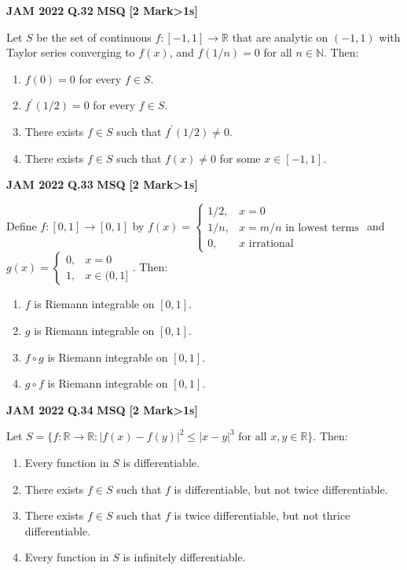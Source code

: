 \documentclass[11pt,a4paper]{article}
\newcommand{\pyqheader}[4]{%
    \noindent\begin{tcolorbox}[
        colback=badgebg,
        colframe=secondary,
        arc=2mm,
        boxrule=0.6pt,
        top=1.5mm,bottom=1.5mm,left=2mm,right=2mm
    ]
        \textbf{\textcolor{primary}{JAM #1}} \hfill \textbf{Q.#2} \hfill \textsc{\textbf{#3}} \hfill \textbf{[#4 Mark\ifnum#4>1s\fi]}
    \end{tcolorbox}\vspace{-1mm}
}
\begin{document}
\pyqheader{2022}{32}{MSQ}{2}
Let $S$ be the set of continuous $f:[-1,1]\rightarrow\mathbb{R}$ that are analytic on $(-1,1)$ with Taylor series converging to $f(x)$, and $f(1/n)=0$ for all $n\in\mathbb{N}$. Then:
\begin{enumerate}[label=(\Alph*)]
    \item $f(0)=0$ for every $f\in S$.
    \item $f^{\prime}(1/2)=0$ for every $f\in S$.
    \item There exists $f\in S$ such that $f^{\prime}(1/2)\ne 0$.
    \item There exists $f\in S$ such that $f(x)\ne 0$ for some $x\in[-1,1]$.
\end{enumerate}

\pyqheader{2022}{33}{MSQ}{2}
Define $f:[0,1]\rightarrow[0,1]$ by $f(x)=\begin{cases}1/2,& x=0\\ 1/n,& x=m/n \text{ in lowest terms}\\ 0,& x\text{ irrational}\end{cases}$ and $g(x)=\begin{cases}0,& x=0\\ 1,& x\in(0,1]\end{cases}$. Then:
\begin{enumerate}[label=(\Alph*)]
    \item $f$ is Riemann integrable on $[0,1]$.
    \item $g$ is Riemann integrable on $[0,1]$.
    \item $f\circ g$ is Riemann integrable on $[0,1]$.
    \item $g\circ f$ is Riemann integrable on $[0,1]$.
\end{enumerate}

\pyqheader{2022}{34}{MSQ}{2}
Let $S=\{f:\mathbb{R}\rightarrow\mathbb{R} : |f(x)-f(y)|^{2}\le |x-y|^{3} \text{ for all } x,y\in\mathbb{R}\}$. Then:
\begin{enumerate}[label=(\Alph*)]
    \item Every function in $S$ is differentiable.
    \item There exists $f\in S$ such that $f$ is differentiable, but not twice differentiable.
    \item There exists $f\in S$ such that $f$ is twice differentiable, but not thrice differentiable.
    \item Every function in $S$ is infinitely differentiable.
\end{enumerate}
\end{document}
